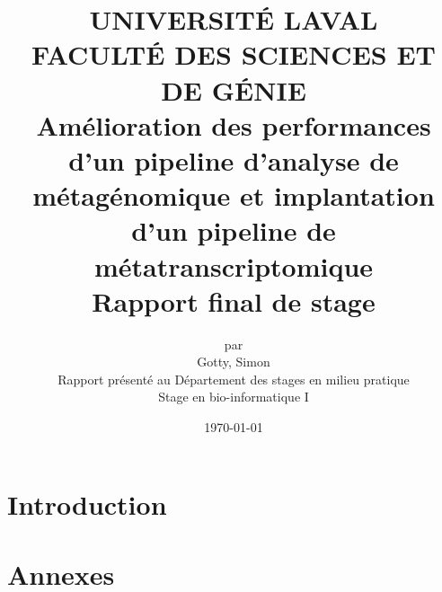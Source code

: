 \documentclass[letterpaper,10pt,titlepage]{article}
\title{%
    \vspace{-2cm}\Large{UNIVERSITÉ LAVAL\\FACULTÉ DES SCIENCES ET DE GÉNIE}\\\vspace{2cm}
    \textbf{Amélioration des performances d'un pipeline d'analyse de métagénomique et implantation d'un pipeline de métatranscriptomique}\\\vspace{2cm}
    \Large{Rapport final de stage}\\\vspace{2cm}
}
\author{%
    par\\
    Gotty, Simon\vspace{2cm}\\
    Rapport présenté au Département des stages en milieu pratique\\
    Stage en bio-informatique I
}
\date{\vspace{\fill}\today}
\begin{document}
\begin{onehalfspace}
\maketitle
\newpage

\section{Introduction}




\newpage







\newpage
\section{Annexes}



\end{onehalfspace}
\end{document}
